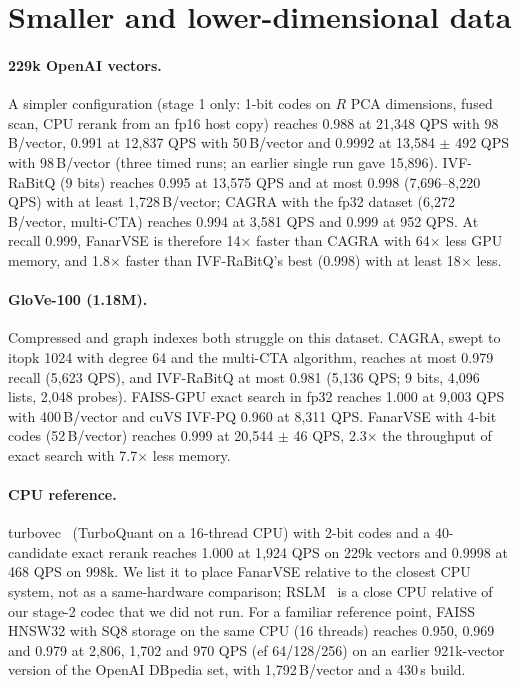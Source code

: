 \documentclass[10pt]{article}
\begin{document}
\section{Smaller and lower-dimensional data}\label{sn:small}
\paragraph{229k OpenAI vectors.} A simpler configuration (stage 1 only: 1-bit codes on $R$ PCA dimensions, fused scan, CPU rerank from an fp16 host copy) reaches 0.988 at 21{,}348 QPS with 98\,B/vector, 0.991 at 12{,}837 QPS with 50\,B/vector and 0.9992 at 13{,}584 $\pm$ 492 QPS with 98\,B/vector (three timed runs; an earlier single run gave 15{,}896). IVF-RaBitQ (9 bits) reaches 0.995 at 13{,}575 QPS and at most 0.998 (7{,}696--8{,}220 QPS) with at least 1{,}728\,B/vector; CAGRA with the fp32 dataset (6{,}272\,B/vector, multi-CTA) reaches 0.994 at 3{,}581 QPS and 0.999 at 952 QPS. At recall 0.999, FanarVSE is therefore 14$\times$ faster than CAGRA with 64$\times$ less GPU memory, and 1.8$\times$ faster than IVF-RaBitQ's best (0.998) with at least 18$\times$ less.

\paragraph{GloVe-100 (1.18M).} Compressed and graph indexes both struggle on this dataset. CAGRA, swept to itopk 1024 with degree 64 and the multi-CTA algorithm, reaches at most 0.979 recall (5{,}623 QPS), and IVF-RaBitQ at most 0.981 (5{,}136 QPS; 9 bits, 4{,}096 lists, 2{,}048 probes). FAISS-GPU exact search in fp32 reaches 1.000 at 9{,}003 QPS with 400\,B/vector and cuVS IVF-PQ 0.960 at 8{,}311 QPS. FanarVSE with 4-bit codes (52\,B/vector) reaches 0.999 at 20{,}544 $\pm$ 46 QPS, 2.3$\times$ the throughput of exact search with 7.7$\times$ less memory.

\paragraph{CPU reference.} turbovec~\cite{turbovec} (TurboQuant on a 16-thread CPU) with 2-bit codes and a 40-candidate exact rerank reaches 1.000 at 1{,}924 QPS on 229k vectors and 0.9998 at 468 QPS on 998k. We list it to place FanarVSE relative to the closest CPU system, not as a same-hardware comparison; RSLM~\cite{lenhardt2026rslm} is a close CPU relative of our stage-2 codec that we did not run. For a familiar reference point, FAISS HNSW32 with SQ8 storage on the same CPU (16 threads) reaches 0.950, 0.969 and 0.979 at 2{,}806, 1{,}702 and 970 QPS (ef 64/128/256) on an earlier 921k-vector version of the OpenAI DBpedia set, with 1{,}792\,B/vector and a 430\,s build.
\end{document}
